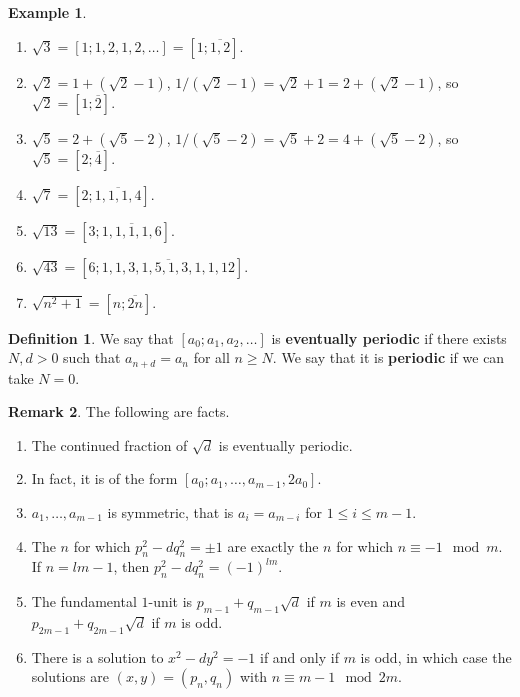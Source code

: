 \documentclass{article}
\newcommand{\rb}[1]{\left( #1 \right)}
\renewcommand{\sb}[1]{\left[ #1 \right]}
\theoremstyle{definition}\newtheorem{definition}{Definition}
\theoremstyle{definition}\newtheorem{remark}[definition]{Remark}
\theoremstyle{definition}\newtheorem*{example}{Example}
\theoremstyle{definition}\newtheorem*{note}{Note}
\begin{document}
\begin{example}
\hfill
\begin{enumerate}
\item $ \sqrt{3} = \sb{1; 1, 2, 1, 2, \dots} = \sb{1; \overline{1, 2}} $.
\item $ \sqrt{2} = 1 + \rb{\sqrt{2} - 1} $, $ 1 / \rb{\sqrt{2} - 1} = \sqrt{2} + 1 = 2 + \rb{\sqrt{2} - 1} $, so $ \sqrt{2} = \sb{1; \overline{2}} $.
\item $ \sqrt{5} = 2 + \rb{\sqrt{5} - 2} $, $ 1 / \rb{\sqrt{5} - 2} = \sqrt{5} + 2 = 4 + \rb{\sqrt{5} - 2} $, so $ \sqrt{5} = \sb{2; \overline{4}} $.
\item $ \sqrt{7} = \sb{2; \overline{1, 1, 1, 4}} $.
\item $ \sqrt{13} = \sb{3; \overline{1, 1, 1, 1, 6}} $.
\item $ \sqrt{43} = \sb{6; \overline{1, 1, 3, 1, 5, 1, 3, 1, 1, 12}} $.
\item $ \sqrt{n^2 + 1} = \sb{n; \overline{2n}} $.
\end{enumerate}
\end{example}

\begin{definition}
We say that $ \sb{a_0; a_1, a_2, \dots} $ is \textbf{eventually periodic} if there exists $ N, d > 0 $ such that $ a_{n + d} = a_n $ for all $ n \ge N $. We say that it is \textbf{periodic} if we can take $ N = 0 $.
\end{definition}

\begin{remark}
The following are facts.
\begin{enumerate}
\item The continued fraction of $ \sqrt{d} $ is eventually periodic.
\item In fact, it is of the form $ \sb{a_0; a_1, \dots, a_{m - 1}, 2a_0} $.
\item $ a_1, \dots, a_{m - 1} $ is symmetric, that is $ a_i = a_{m - i} $ for $ 1 \le i \le m - 1 $.
\item The $ n $ for which $ p_n^2 - dq_n^2 = \pm 1 $ are exactly the $ n $ for which $ n \equiv -1 \mod m $. If $ n = lm - 1 $, then $ p_n^2 - dq_n^2 = \rb{-1}^{lm} $.
\item The fundamental $ 1 $-unit is $ p_{m - 1} + q_{m - 1}\sqrt{d} $ if $ m $ is even and $ p_{2m - 1} + q_{2m - 1}\sqrt{d} $ if $ m $ is odd.
\item There is a solution to $ x^2 - dy^2 = -1 $ if and only if $ m $ is odd, in which case the solutions are $ \rb{x, y} = \rb{p_n, q_n} $ with $ n \equiv m - 1 \mod 2m $.
\end{enumerate}
\end{remark}
\end{document}
